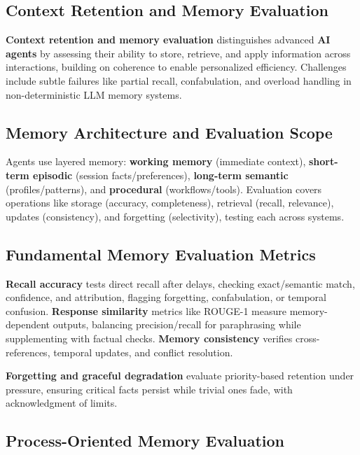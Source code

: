 \begin{TNtwocol}
\section{Context Retention and Memory Evaluation}

\textbf{Context retention and memory evaluation} distinguishes advanced \textbf{AI agents} by assessing their ability to store, retrieve, and apply information across interactions, building on coherence to enable personalized efficiency. Challenges include subtle failures like partial recall, confabulation, and overload handling in non-deterministic LLM memory systems.
​

\subsection*{Memory Architecture and Evaluation Scope}

Agents use layered memory: \textbf{working memory} (immediate context), \textbf{short-term episodic} (session facts/preferences), \textbf{long-term semantic} (profiles/patterns), and \textbf{procedural} (workflows/tools). Evaluation covers operations like storage (accuracy, completeness), retrieval (recall, relevance), updates (consistency), and forgetting (selectivity), testing each across systems.
​

\subsection*{Fundamental Memory Evaluation Metrics}

\textbf{Recall accuracy} tests direct recall after delays, checking exact/semantic match, confidence, and attribution, flagging forgetting, confabulation, or temporal confusion. \textbf{Response similarity} metrics like ROUGE-1 measure memory-dependent outputs, balancing precision/recall for paraphrasing while supplementing with factual checks. \textbf{Memory consistency} verifies cross-references, temporal updates, and conflict resolution.
​

\textbf{Forgetting and graceful degradation} evaluate priority-based retention under pressure, ensuring critical facts persist while trivial ones fade, with acknowledgment of limits.
​

\subsection*{Process-Oriented Memory Evaluation}


\end{TNtwocol}
